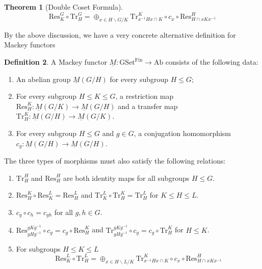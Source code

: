 \documentclass{article}
\theoremstyle{definition}
\newtheorem{theorem}{Theorem}[section] %
\newtheorem{definition}[theorem]{Definition}
\begin{document}
\begin{tcolorbox}[colback=red!5!white,colframe=red!30!white]
\begin{theorem}[Double Coset Formula]
    \[\textrm{Res}_K^G\circ \textrm{Tr}_H^G=\oplus_{x\in H\backslash G/K }\textrm{Tr}_{x^{-1}Hx\cap K}^{K}\circ c_{x}\circ \textrm{Res}_{H\cap xKx^{-1}}^{H}\]
\end{theorem}
\end{tcolorbox}

By the above discussion, we have a very concrete alternative definition for Mackey functors


\begin{tcolorbox}[colback=purple!5!white,colframe=purple!75!black]
\begin{definition}
\label{Mackeyex}
A Mackey functor $\underline{M}: \textrm{GSet}^{\textrm{Fin}}\to \textrm{Ab}$ consists of the following data:  
\begin{enumerate}
    \item An abelian group $\underline{M}(G/H)$ for every subgroup $H\leq G$;
    \item For every subgroup $H\leq K\leq G$, a restriction map $\textrm{Res}_H^K: \underline{M}(G/K)\to \underline{M}(G/H)$ and a transfer map $\textrm{Tr}_H^K: \underline{M}(G/H)\to \underline{M}(G/K)$.
    \item For every subgroup $H\leq G$ and $g\in G$, a conjugation homomorphism $c_g: \underline{M}(G/H)\to \underline{M}(G/H)$.
    

\end{enumerate}
The three types of morphisms must also satisfy the following relations:
\begin{enumerate}
    \item $\textrm{Tr}_H^H$ and $\textrm{Res}_H^H$ are both identity maps for all subgroups $H\leq G$.
    \item $\textrm{Res}_H^K\circ \textrm{Res}_K^L=\textrm{Res}_H^L$ and 
     $\textrm{Tr}_K^L\circ \textrm{Tr}_H^K=\textrm{Tr}_H^L$ for $K\leq H\leq L$.
    \item $c_g\circ c_h=c_{gh}$ for all $g,h\in G$.
    \item $\textrm{Res}_{gHg^{-1}}^{gKg^{-1}}\circ c_g=c_g\circ \textrm{Res}^{K}_{H}$ and $\textrm{Tr}_{gHg^{-1}}^{gKg^{-1}}\circ c_g=c_g\circ \textrm{Tr}^{K}_{H}$ for $H\leq K$.
    \item   For subgroups $H\leq K\leq L$
      \[\textrm{Res}_K^L\circ \textrm{Tr}_H^L=\oplus_{x\in H\backslash L/K }\textrm{Tr}_{x^{-1}Hx\cap K}^{K}\circ c_{x}\circ \textrm{Res}_{H\cap xKx^{-1}}^{H}\]
\end{enumerate}
\end{definition}
\end{tcolorbox}
\end{document}

